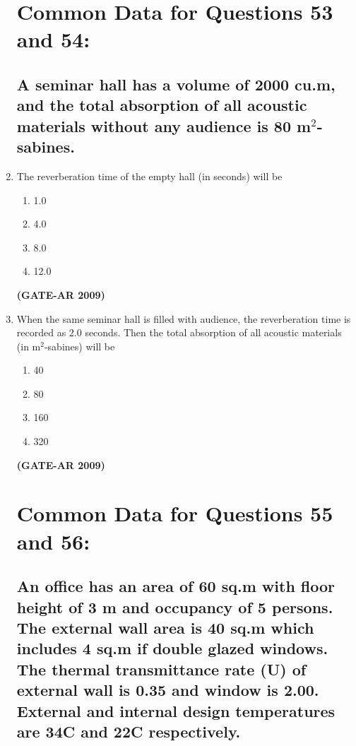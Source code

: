 \documentclass[a4paper,10pt]{article}
\begin{document}
\begin{enumerate}
\section*{Common Data for Questions 53 and 54:}
\subsection*{A seminar hall has a volume of 2000 cu.m, and the total absorption of all acoustic materials without any audience is 80 m\(^2\)-sabines.}

    \item The reverberation time of the empty hall (in seconds) will be 
    \begin{multicols}{4}
	\begin{enumerate}
        \item 1.0
        \item 4.0
        \item 8.0
        \item 12.0
    \end{enumerate}
	\end{multicols}
    \hfill \textbf{(GATE-AR 2009)}

    \item When the same seminar hall is filled with audience, the reverberation time is recorded as 2.0 seconds. Then the total absorption of all acoustic materials (in m\(^2\)-sabines) will be 
    \begin{multicols}{4}
	\begin{enumerate}
        \item 40
        \item 80
        \item 160
        \item 320
    \end{enumerate}
	\end{multicols}
    \hfill \textbf{(GATE-AR 2009)}
	
\section*{Common Data for Questions 55 and 56:}
\subsection*{An office has an area of 60 sq.m with floor height of 3 m and occupancy of 5 persons. The external wall area is 40 sq.m which includes 4 sq.m if double glazed windows. The thermal transmittance rate (U) of external wall is 0.35 and window is 2.00. External and internal design temperatures are 34\textdegree C and 22\textdegree C respectively.}


\end{enumerate}
\end{document}
